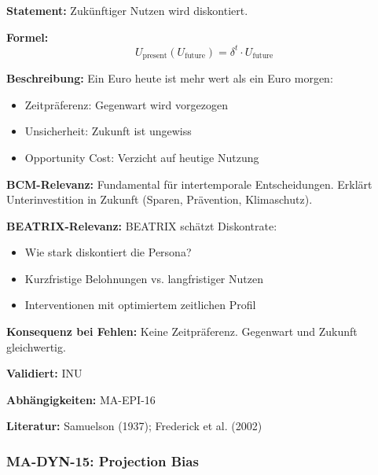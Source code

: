 \textbf{Statement:} Zukünftiger Nutzen wird diskontiert.

\textbf{Formel:}
\begin{equation}
U_{\text{present}}(U_{\text{future}}) = \delta^t \cdot U_{\text{future}}
\end{equation}

\textbf{Beschreibung:}
Ein Euro heute ist mehr wert als ein Euro morgen:
\begin{itemize}
    \item Zeitpräferenz: Gegenwart wird vorgezogen
    \item Unsicherheit: Zukunft ist ungewiss
    \item Opportunity Cost: Verzicht auf heutige Nutzung
\end{itemize}

\textbf{BCM-Relevanz:}
Fundamental für intertemporale Entscheidungen. Erklärt Unterinvestition in Zukunft (Sparen, Prävention, Klimaschutz).

\textbf{BEATRIX-Relevanz:}
BEATRIX schätzt Diskontrate:
\begin{itemize}
    \item Wie stark diskontiert die Persona?
    \item Kurzfristige Belohnungen vs. langfristiger Nutzen
    \item Interventionen mit optimiertem zeitlichen Profil
\end{itemize}

\textbf{Konsequenz bei Fehlen:}
Keine Zeitpräferenz. Gegenwart und Zukunft gleichwertig.

\textbf{Validiert:} INU

\textbf{Abhängigkeiten:} MA-EPI-16

\textbf{Literatur:} Samuelson (1937); Frederick et al. (2002)



\subsubsection*{MA-DYN-15: Projection Bias}

